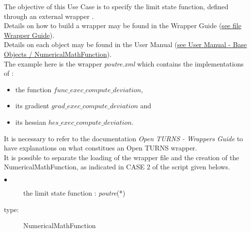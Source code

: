 \renewcommand{\filename}{docUC_LSF_wrapper.tex}
\renewcommand{\filetitle}{UC : From an external wrapper with gradient and hessian implementations}

\HeaderIIILevel




The objective of this Use Case is to specify the limit state function, defined through an external wrapper .\\

Details on how to build a wrapper   may be found in the Wrapper Guide (\href{OpenTURNS_WrappersGuide.pdf}{see file Wrapper Guide}).\\

Details on each object may be found in the User Manual  (\href{OpenTURNS_UserManual_TUI.pdf}{see User Manual - Base Objects / NumericalMathFunction}).\\

The example here is the wrapper {\itshape poutre.xml} which contains the implementations of :
\begin{itemize}
\item the function $func\_exec\_compute\_deviation$,
\item its gradient $grad\_exec\_compute\_deviation$ and
\item its hessian $hes\_exec\_compute\_deviation$.
\end{itemize}
\vspace*{0.5cm}

It is necessary to refer to the documentation {\itshape Open TURNS - Wrappers Guide} to have explanations on what constitues an Open TURNS wrapper. \\
It is possible to separate the loading of the wrapper file and the creation of the NumericalMathFunction, as indicated in CASE 2 of the script given belows.

{
  \begin{description}
  \item[$\bullet$] the limit state function : {\itshape poutre}(*)
  \item[type:]  NumericalMathFunction
  \end{description}
}

